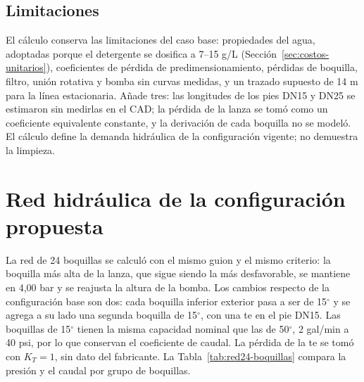 \subsection{Limitaciones}

El cálculo conserva las limitaciones del caso base: propiedades del agua, adoptadas porque el detergente se dosifica a 7--15 g/L (Sección~\ref{sec:costos-unitarios}), coeficientes de pérdida de predimensionamiento, pérdidas de boquilla, filtro, unión rotativa y bomba sin curvas medidas, y un trazado supuesto de 14 m para la línea estacionaria. Añade tres: las longitudes de los pies DN15 y DN25 se estimaron sin medirlas en el CAD; la pérdida de la lanza se tomó como un coeficiente equivalente constante, y la derivación de cada boquilla no se modeló. El cálculo define la demanda hidráulica de la configuración vigente; no demuestra la limpieza.

\section{Red hidráulica de la configuración propuesta}
\label{sec:memoria-red24}

La red de 24 boquillas se calculó con el mismo guion y el mismo criterio: la boquilla más alta de la lanza, que sigue siendo la más desfavorable, se mantiene en 4,00 bar y se reajusta la altura de la bomba. Los cambios respecto de la configuración base son dos: cada boquilla inferior exterior pasa a ser de 15$^\circ$ y se agrega a su lado una segunda boquilla de 15$^\circ$, con una te en el pie DN15. Las boquillas de 15$^\circ$ tienen la misma capacidad nominal que las de 50$^\circ$, 2 gal/min a 40 psi, por lo que conservan el coeficiente de caudal. La pérdida de la te se tomó con $K_T=1$, sin dato del fabricante. La Tabla~\ref{tab:red24-boquillas} compara la presión y el caudal por grupo de boquillas.

